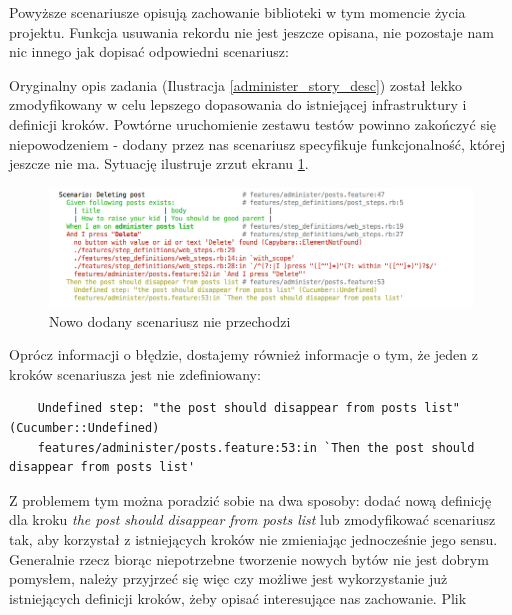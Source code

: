   	
  	
  	Powyższe scenariusze opisują zachowanie biblioteki w tym momencie życia projektu. Funkcja usuwania rekordu nie jest jeszcze opisana, nie pozostaje nam nic innego jak dopisać odpowiedni scenariusz:
  	
  	
  	
  	Oryginalny opis zadania (Ilustracja \ref{administer_story_desc}) został lekko zmodyfikowany w celu lepszego dopasowania do istniejącej infrastruktury i definicji kroków. Powtórne uruchomienie zestawu testów powinno zakończyć się niepowodzeniem - dodany przez nas scenariusz specyfikuje funkcjonalność, której jeszcze nie ma. Sytuację ilustruje zrzut ekranu \ref{scenario_failure}.
  	
  	\clearpage
  	
  	\begin{figure}[!h]
  		\begin{center}
  			\includegraphics[width=\linewidth]{images/scenario_failure.png}
  			\caption{Nowo dodany scenariusz nie przechodzi}
  			\label{scenario_failure}
  		\end{center}
  	\end{figure}
  	
  	Oprócz informacji o błędzie, dostajemy również informacje o tym, że jeden z kroków scenariusza jest nie zdefiniowany:
  	
  	\begin{lstlisting}
    Undefined step: "the post should disappear from posts list" (Cucumber::Undefined)
    features/administer/posts.feature:53:in `Then the post should disappear from posts list'
    \end{lstlisting}
    
    Z problemem tym można poradzić sobie na dwa sposoby: dodać nową definicję dla kroku \emph{the post should disappear from posts list} lub zmodyfikować scenariusz tak, aby korzystał z istniejących kroków nie zmieniając jednocześnie jego sensu. Generalnie rzecz biorąc niepotrzebne tworzenie nowych bytów nie jest dobrym pomysłem, należy przyjrzeć się więc czy możliwe jest wykorzystanie już istniejących definicji kroków, żeby opisać interesujące nas zachowanie. Plik
    
